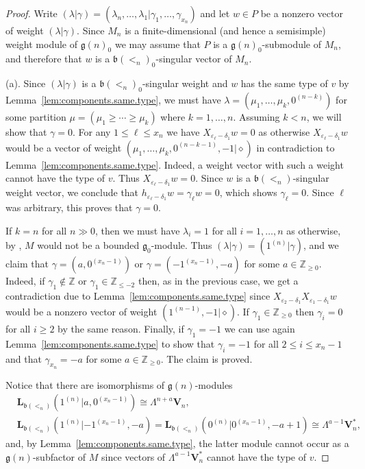 \documentclass[12pt]{amsart}
\newcommand\Z{\mathbb{Z}}
\newcommand\g{\mathfrak{g}}
\newcommand\fb{\mathfrak{b}}
\newcommand\bV{\mathbf{V}}
\newcommand\bL{\mathbf{L}}
\theoremstyle{plain}
\theoremstyle{definition}
\numberwithin{equation}{section}
\begin{document}
\begin{proof}
Write $(\lambda|\gamma) = (\lambda_n, \ldots, \lambda_1 | \gamma_1,\ldots, \gamma_{x_n})$ and let $w\in P$ be a nonzero vector of weight $(\lambda | \gamma)$. Since $M_n$ is a finite-dimensional (and hence a semisimple) weight module of $\g(n)_0$ we may assume that $P$ is a $\g(n)_0$-submodule of $M_n$, and therefore that $w$ is a $\fb(<_n)_0$-singular vector of $M_n$.


(a). Since $(\lambda|\gamma)$ is a $\fb(<_n)_0$-singular weight and $w$ has the same type of $v$ by Lemma~\ref{lem:components.same.type}, we must have $\lambda = (\mu_1,\ldots,\mu_k,0^{(n-k)})$ for some partition $\mu = (\mu_1\geq \cdots \geq \mu_k)$ where $k=1,\ldots, n$. Assuming $k<n$, we will show that $\gamma = 0$. For any $1\leq \ell\leq x_n$ we have $X_{\varepsilon_\ell - \delta_1}w=0$ as otherwise $X_{\varepsilon_\ell - \delta_1}w$ would be a vector of weight $(\mu_1,\ldots,\mu_k,0^{(n-k-1)},-1|\diamond)$ in contradiction to Lemma~\ref{lem:components.same.type}. Indeed, a weight vector with such a weight cannot have the type of $v$. Thus $X_{\varepsilon_\ell - \delta_1}w=0$. Since $w$ is a $\fb(<_n)$-singular weight vector, we conclude that $h_{\varepsilon_\ell - \delta_1}w=\gamma_\ell w = 0$, which shows $\gamma_\ell=0$. Since $\ell$ was arbitrary, this proves that $\gamma=0$.

If $k=n$ for all $n\gg 0$, then we must have $\lambda_i=1$ for all $i=1,\ldots, n$ as otherwise, by \cite[Theorem~5.1]{GP20}, $M$ would not be a bounded $\g_0$-module. Thus $(\lambda | \gamma) = (1^{(n)}|\gamma)$, and we claim that $\gamma=(a, 0^{(x_n-1)})$ or $\gamma=(-1^{(x_n-1)}, -a)$ for some $a\in \Z_{\geq 0}$. Indeed, if $\gamma_1\notin \Z$ or $\gamma_1\in \Z_{\leq -2}$ then, as in the previous case, we get a contradiction due to Lemma~\ref{lem:components.same.type} since $X_{\varepsilon_2 - \delta_1} X_{\varepsilon_1 - \delta_1}w$ would be a nonzero vector of weight $(1^{(n-1)}, -1|\diamond)$. If $\gamma_1 \in \Z_{\geq 0}$ then $\gamma_i = 0$ for all $i\geq 2$ by the same reason. Finally, if $\gamma_1 = -1$ we can use again  Lemma~\ref{lem:components.same.type} to show that $\gamma_i = -1$ for all $2\leq i\leq x_n-1$ and that $\gamma_{x_n}=-a$ for some $a\in \Z_{\geq 0}$. The claim is proved. 

Notice that there are isomorphisms of $\g(n)$-modules
\begin{align*}
& \bL_{\fb(<_n)}(1^{(n)}|a, 0^{(x_n-1)}) \cong \Lambda^{n+a}\bV_n, \\
& \bL_{\fb(<_n)}(1^{(n)} | -1^{(x_n-1)}, -a) = \bL_{\fb(<_n)}(0^{(n)} | 0^{(x_n-1)}, -a+1)\cong \Lambda^{a-1}\bV_n^*,
\end{align*}
and, by Lemma~\ref{lem:components.same.type}, the latter module cannot occur as a $\g(n)$-subfactor of $M$ since vectors of $\Lambda^{a-1}\bV_n^*$ cannot have the type of $v$. %


\end{proof}
\end{document}
